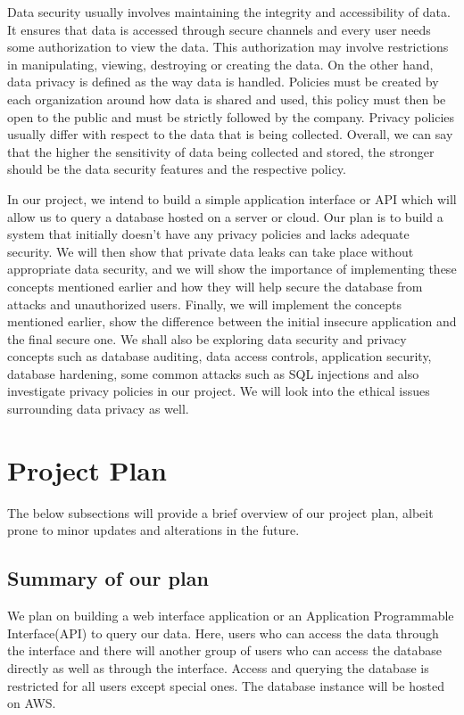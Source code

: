 \documentclass[sigconf]{acmart}
\begin{document}
Data security usually involves maintaining the integrity and accessibility of data. It ensures that data is accessed through secure channels and every user needs some authorization to view the data. This authorization may involve restrictions in manipulating, viewing, destroying or creating the data. On the other hand, data privacy is defined as the way data is handled. Policies must be created by each organization around how data is shared and used, this policy must then be open to the public and must be strictly followed by the company. Privacy policies usually differ with respect to the data that is being collected. Overall, we can say that the higher the sensitivity of data being collected and stored, the stronger should be the data security features and the respective policy. 

In our project, we intend to build a simple application interface or API which will allow us to query a database hosted on a server or cloud. Our plan is to build a system that initially doesn't have any privacy policies and lacks adequate security. We will then show that private data leaks can take place without appropriate data security, and we will show the importance of implementing these concepts mentioned earlier and how they will help secure the database from attacks and unauthorized users. Finally, we will implement the concepts mentioned earlier, show the difference between the initial insecure application and the final secure one. We shall also be exploring data security and privacy concepts such as database auditing, data access controls, application security, database hardening, some common attacks such as SQL injections and also investigate privacy policies in our project. We will look into the ethical issues surrounding data privacy as well. 


\section{Project Plan}
The below subsections will provide a brief overview of our project plan, albeit prone to minor updates and alterations in the future.

\subsection{Summary of our plan}
We plan on building a  web interface application or an Application Programmable Interface(API) to query our data. Here, users who can access the data through the interface and there will another group of users who can access the database directly as well as through the interface. Access and querying the database is restricted for all users except special ones. The database instance will be hosted on AWS. 
\end{document}
